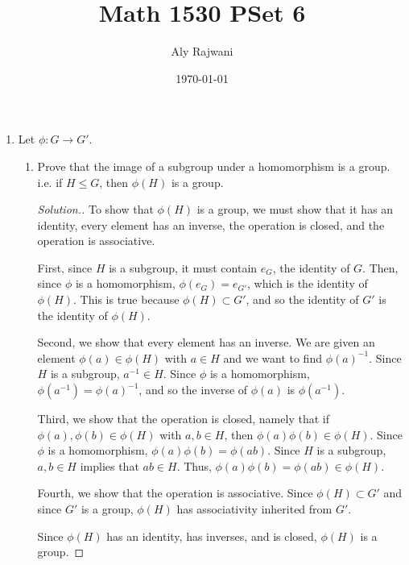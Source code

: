\documentclass{article}
\title{Math 1530 PSet 6}
\author{Aly Rajwani}
\date{\today}
\newcommand{\sk}{\smallskip}
\begin{document}
\maketitle

\begin{enumerate}

    \item Let $\phi: G \rightarrow G'$.
    \begin{enumerate}
        \item Prove that the image of a subgroup under a homomorphism is a group. i.e. if $H \leq G$, then $\phi(H)$ is a group.

        \begin{proof}[Solution.]
            To show that $\phi(H)$ is a group, we must show that it has an identity, every element has an inverse, the operation is closed, and the operation is associative.

            \sk

            First, since $H$ is a subgroup, it must contain $e_G$, the identity of $G$. Then, since $\phi$ is a homomorphism, $\phi(e_G) = e_{G'}$, which is the identity of $\phi(H)$. This is true because $\phi(H) \subset G'$, and so the identity of $G'$ is the identity of $\phi(H)$.

            \sk

            Second, we show that every element has an inverse. We are given an element $\phi(a) \in \phi(H)$ with $a \in H$ and we want to find $\phi(a)^{-1}$. Since $H$ is a subgroup, $a^{-1} \in H$. Since $\phi$ is a homomorphism, $\phi(a^{-1}) = \phi(a)^{-1}$, and so the inverse of $\phi(a)$ is $\phi(a^{-1})$.

            \sk

            Third, we show that the operation is closed, namely that if $\phi(a), \phi(b) \in \phi(H)$ with $a, b \in H$, then $\phi(a)\phi(b) \in \phi(H)$. Since $\phi$ is a homomorphism, $\phi(a)\phi(b) = \phi(ab)$. Since $H$ is a subgroup, $a, b \in H$ implies that $ab \in H$. Thus, $\phi(a)\phi(b) = \phi(ab) \in \phi(H)$. 

            \sk

            Fourth, we show that the operation is associative. Since $\phi(H) \subset G'$ and since $G'$ is a group, $\phi(H)$ has associativity inherited from $G'$.

            \sk

            Since $\phi(H)$ has an identity, has inverses, and is closed, $\phi(H)$ is a group.
            

\end{proof}
\end{enumerate}
\end{enumerate}
\end{document}
